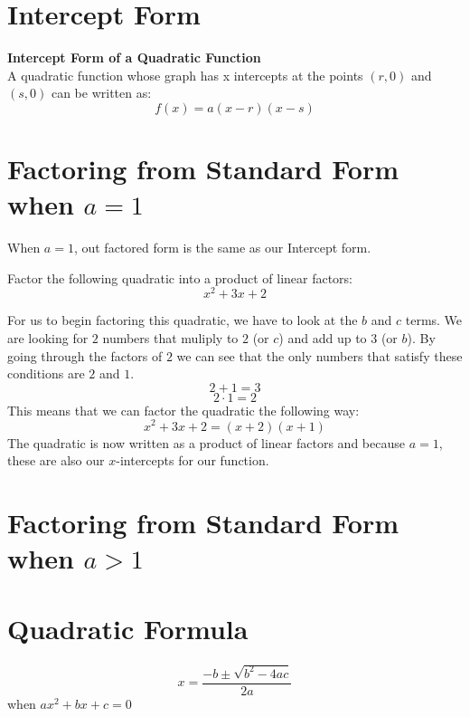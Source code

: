 \documentclass{ximera}
\begin{document}
\section{Intercept Form}
\begin{callout} \textbf{\large{Intercept Form of a Quadratic Function}}\\
          A quadratic function whose graph has x intercepts at the points $(r,0)$ and $(s,0)$ can be written as:\\
\[
f(x)=a(x-r)(x-s)
\]
\end{callout}

\begin{example}
\begin{explanation}

\end{explanation}
\end{example}
\section{Factoring from Standard Form when $a=1$}
When $a=1$, out factored form is the same as our Intercept form.

\begin{example}
Factor the following quadratic into a product of linear factors:
\[
x^2+3x+2
\]

\begin{explanation}
For us to begin factoring this quadratic, we have to look at the $b$ and $c$ terms. We are looking for $2$ numbers that muliply to $2$ (or $c$) and add up to $3$ (or $b$). By going through the factors of $2$ we can see that the only numbers that satisfy these conditions are $2$ and $1$.
\[
2+1=3
\]
\[
2\cdot 1=2
\]
This means that we can factor the quadratic the following way:
\[
x^2+3x+2=(x+2)(x+1)
\]
The quadratic is now written as a product of linear factors and because $a=1$, these are also our $x$-intercepts for our function.
\end{explanation}
\end{example}

\section{Factoring from Standard Form when $a>1$}
\section{Quadratic Formula}
\begin{callout}
\[
x=\frac{-b\pm \sqrt{b^2-4ac}}{2a}
\]
when $ax^2+bx+c =0$
\end{callout}
\end{document}
